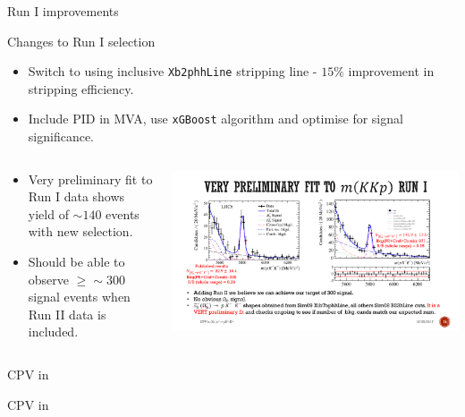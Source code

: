 \documentclass{beamer}
\begin{document}
\begin{frame}{ Run I improvements}
  \small
  \begin{block}{Changes to Run I selection}
    \begin{itemize}
    \item Switch to using inclusive \texttt{Xb2phhLine} stripping line - $15\%$ improvement in stripping efficiency.
    \item Include PID in MVA, use \texttt{xGBoost} algorithm and optimise for signal significance.
    \end{itemize}
  \end{block}
  \begin{columns}
    \begin{column}{.5\textwidth}
      \begin{itemize}
      \item Very preliminary fit to Run I data shows yield of $\sim 140$ events with new selection.
      \item Should be able to observe $\geq \sim300$ signal events when Run II data is included.
      \end{itemize}
    \end{column}
    \begin{column}{.5\textwidth}
      \includegraphics[width=\textwidth]{Run1ImprovedXib.pdf}
    \end{column}
  \end{columns}
\end{frame}

\begin{frame}{CPV in }
  \begin{block}{}
    \begin{center}
      \Huge CPV in 
    \end{center}
  \end{block}
\end{frame}
\end{document}
